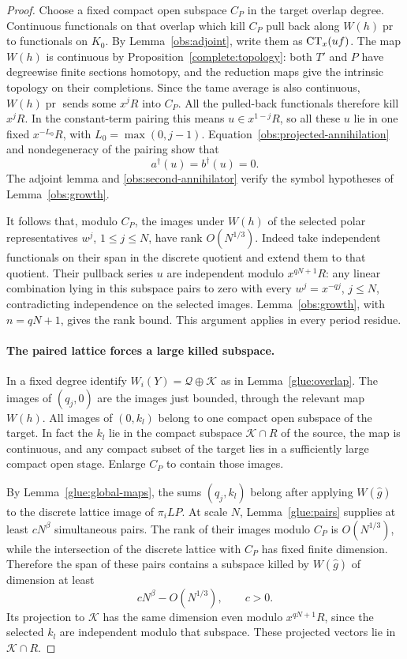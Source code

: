 \begin{proof}
Choose a fixed compact open subspace $C_P$ in the target overlap
degree.  Continuous functionals on that overlap which kill $C_P$
pull back along $W(h)\operatorname{pr}$ to functionals on $K_0$.
By Lemma~\ref{obs:adjoint}, write them as $\operatorname{CT}_x(uf)$.
The map $W(h)$ is continuous by
Proposition~\ref{complete:topology}: both $T'$ and $P$ have
degreewise finite sections homotopy, and the reduction maps give
the intrinsic topology on their completions. Since the tame average
is also continuous, $W(h)\operatorname{pr}$ sends some $x^jR$
into $C_P$. All the pulled-back functionals therefore kill
$x^jR$. In the constant-term pairing this means
$u\in x^{1-j}R$, so all these $u$ lie in one fixed
$x^{-L_0}R$, with $L_0=\max(0,j-1)$.
Equation~\eqref{obs:projected-annihilation} and nondegeneracy
of the pairing show that
\[
 a^\dagger(u)=b^\dagger(u)=0.
\]
The adjoint lemma and \eqref{obs:second-annihilator} verify the
symbol hypotheses of Lemma~\ref{obs:growth}.

It follows that, modulo $C_P$, the images under $W(h)$ of the
selected polar representatives $w^j$, $1\leq j\leq N$, have
rank $O(N^{1/3})$.  Indeed take independent functionals on their
span in the discrete quotient and extend them to that quotient.
Their pullback series $u$ are independent modulo $x^{qN+1}R$:
any linear combination lying in this subspace pairs to zero with
every $w^j=x^{-qj}$, $j\leq N$, contradicting independence on
the selected images.  Lemma~\ref{obs:growth}, with
$n=qN+1$, gives the rank bound.  This argument applies in every
period residue.

\paragraph{The paired lattice forces a large killed subspace.}
In a fixed degree identify
$W_i(Y)=\mathcal Q\oplus\mathcal K$ as in
Lemma~\ref{glue:overlap}.  The images of $(q_j,0)$ are
the images just bounded, through the relevant map $W(h)$.
All images of $(0,k_l)$ belong to one compact open subspace of
the target.  In fact the $k_l$ lie in the compact subspace
$\mathcal K\cap R$ of the source, the map is continuous, and
any compact subset of the target lies in a sufficiently large
compact open stage.  Enlarge $C_P$ to contain those images.

By Lemma~\ref{glue:global-maps}, the sums $(q_j,k_l)$ belong
after applying $W(\widehat g)$ to the discrete lattice image of
$\pi_iLP$.  At scale $N$, Lemma~\ref{glue:pairs} supplies at
least $cN^\beta$ simultaneous pairs.  The rank of their images
modulo $C_P$ is $O(N^{1/3})$, while the intersection of the
discrete lattice with $C_P$ has fixed finite dimension.
Therefore the span of these pairs contains a subspace killed by
$W(\widehat g)$ of dimension at least
\begin{equation}
\label{obs:killed-pair-bound}
 cN^\beta-O(N^{1/3}),\qquad c>0.
\end{equation}
Its projection to $\mathcal K$ has the same dimension even
modulo $x^{qN+1}R$, since the selected $k_l$ are independent
modulo that subspace.  These projected vectors lie in
$\mathcal K\cap R$.


\end{proof}
